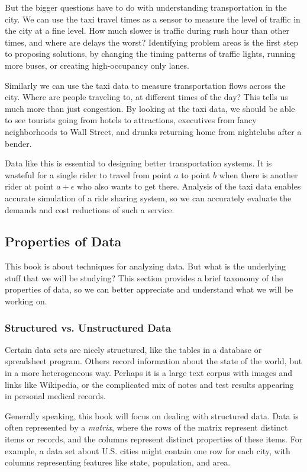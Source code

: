 \documentclass[10pt]{article}
\begin{document}
But the bigger questions have to do with understanding transportation in the city. We can use the taxi travel times as a sensor to measure the level of traffic in the city at a fine level. How much slower is traffic during rush hour than other times, and where are delays the worst? Identifying problem areas is the first step to proposing solutions, by changing the timing patterns of traffic lights, running more buses, or creating high-occupancy only lanes.

Similarly we can use the taxi data to measure transportation flows across the city. Where are people traveling to, at different times of the day? This tells us much more than just congestion. By looking at the taxi data, we should be able to see tourists going from hotels to attractions, executives from fancy neighborhoods to Wall Street, and drunks returning home from nightclubs after a bender.

Data like this is essential to designing better transportation systems. It is wasteful for a single rider to travel from point $a$ to point $b$ when there is another rider at point $a+\epsilon$ who also wants to get there. Analysis of the taxi data enables accurate simulation of a ride sharing system, so we can accurately evaluate the demands and cost reductions of such a service.

\subsection{Properties of Data}
This book is about techniques for analyzing data. But what is the underlying stuff that we will be studying? This section provides a brief taxonomy of the properties of data, so we can better appreciate and understand what we will be working on.

\subsubsection{Structured vs. Unstructured Data}
Certain data sets are nicely structured, like the tables in a database or spreadsheet program. Others record information about the state of the world, but in a more heterogeneous way. Perhaps it is a large text corpus with images and links like Wikipedia, or the complicated mix of notes and test results appearing in personal medical records.

Generally speaking, this book will focus on dealing with structured data. Data is often represented by a \emph{matrix}, where the rows of the matrix represent distinct items or records, and the columns represent distinct properties of these items. For example, a data set about U.S. cities might contain one row for each city, with columns representing features like state, population, and area.
\end{document}
